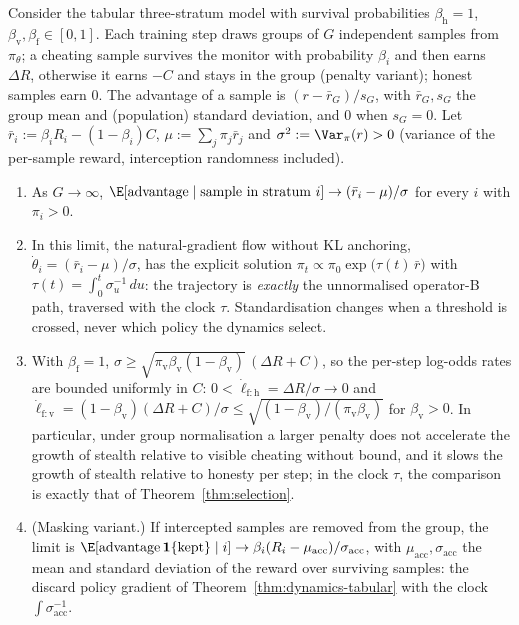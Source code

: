 
\begin{proposition}\label{prop:grpo}
Consider the tabular three-stratum model with survival probabilities $\beta_{\mathrm{h}} = 1$, $\beta_{\mathrm{v}}, \beta_{\mathrm{f}} \in [0,1]$. Each training step draws groups of $G$ independent samples from $\pi_\theta$; a cheating sample survives the monitor with probability $\beta_i$ and then earns $\Delta R$, otherwise it earns $-C$ and stays in the group (penalty variant); honest samples earn $0$. The advantage of a sample is $(r - \bar r_G)/s_G$, with $\bar r_G, s_G$ the group mean and (population) standard deviation, and $0$ when $s_G = 0$. Let $\bar r_i := \beta_i R_i - (1 - \beta_i) C$, $\mu := \sum_j \pi_j \bar r_j$ and $\sigma^2 := \Var_{\pi}(r) > 0$ (variance of the per-sample reward, interception randomness included).
\begin{enumerate}
  \item As $G \to \infty$, $\E[\text{advantage} \mid \text{sample in stratum } i] \to (\bar r_i - \mu)/\sigma$ for every $i$ with $\pi_i > 0$.
  \item In this limit, the natural-gradient flow without KL anchoring, $\dot\theta_i = (\bar r_i - \mu)/\sigma$, has the explicit solution $\pi_t \propto \pi_0 \exp\big(\tau(t)\, \bar r\big)$ with $\tau(t) = \int_0^t \sigma_u^{-1}\, du$: the trajectory is \emph{exactly} the unnormalised operator-B path, traversed with the clock $\tau$. Standardisation changes when a threshold is crossed, never which policy the dynamics select.
  \item With $\beta_{\mathrm{f}} = 1$, $\sigma \ge \sqrt{\pi_{\mathrm{v}}\beta_{\mathrm{v}}(1-\beta_{\mathrm{v}})}\,(\Delta R + C)$, so the per-step log-odds rates are bounded uniformly in $C$: $0 < \dot\ell_{\mathrm{f:h}} = \Delta R/\sigma \to 0$ and $\dot\ell_{\mathrm{f:v}} = (1-\beta_{\mathrm{v}})(\Delta R + C)/\sigma \le \sqrt{(1-\beta_{\mathrm{v}})/(\pi_{\mathrm{v}}\beta_{\mathrm{v}})}$ for $\beta_{\mathrm{v}} > 0$. In particular, under group normalisation a larger penalty does not accelerate the growth of stealth relative to visible cheating without bound, and it slows the growth of stealth relative to honesty per step; in the clock $\tau$, the comparison is exactly that of Theorem~\ref{thm:selection}.
  \item (Masking variant.) If intercepted samples are removed from the group, the limit is $\E[\text{advantage}\,\mathbf{1}\{\text{kept}\} \mid i] \to \beta_i (R_i - \mu_{\mathrm{acc}})/\sigma_{\mathrm{acc}}$, with $\mu_{\mathrm{acc}}, \sigma_{\mathrm{acc}}$ the mean and standard deviation of the reward over surviving samples: the discard policy gradient of Theorem~\ref{thm:dynamics-tabular} with the clock $\int \sigma_{\mathrm{acc}}^{-1}$.
\end{enumerate}
\end{proposition}


